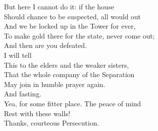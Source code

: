 \documentclass[a4paper,oneside,12pt]{memoir}
\begin{document}
\begin{drama*}
But here I cannot do it: if the house\\
Should chance to be suspected, all would out\\
And we be locked up in the Tower for ever,\\
To make gold there for the state, never come out;\\
And then are you defeated.\\
\persecutionspeaks {} I will tell\\
This to the elders and the weaker sisters,\\
That the whole company of the Separation\\
May join in humble prayer again.\\
\subtlespeaks {} And fasting.\\
\persecutionspeaks Yea, for some fitter place. The peace of mind\\
Rest with these walls!\\
\subtlespeaks {} Thanks, courteous Persecution.\\

\scene


\end{drama*}
\end{document}
